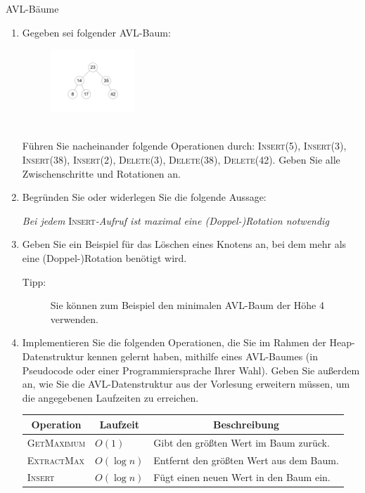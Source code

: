 \documentclass[11pt,a4paper]{article}
\begin{document}
\begin{aufgabe}{3}{AVL-Bäume}
    \begin{enumerate}
        \item Gegeben sei folgender AVL-Baum:
        \begin{figure}[h!]
            \centering
            \includegraphics[width=0.3\textwidth]{img/3a}
        \end{figure}
        \FloatBarrier
        \ \\
        Führen Sie nacheinander folgende Operationen durch: \textsc{Insert(5), Insert(3), Insert(38), Insert(2), Delete(3), Delete(38), Delete(42)}.
        Geben Sie alle Zwischenschritte und Rotationen an.
        \item Begründen Sie oder widerlegen Sie die folgende Aussage:
        \begin{center}
            \emph{Bei jedem }\textsc{Insert}\emph{-Aufruf ist maximal eine (Doppel-)Rotation notwendig}
        \end{center}
        \item Geben Sie ein Beispiel für das Löschen eines Knotens an, bei dem mehr als eine (Doppel-)Rotation benötigt wird.
        \begin{description}
            \item[Tipp:] Sie können zum Beispiel den minimalen AVL-Baum der Höhe 4 verwenden.
        \end{description}
        \item \hard Implementieren Sie die folgenden Operationen, die Sie im Rahmen der Heap-Datenstruktur kennen gelernt haben, mithilfe eines AVL-Baumes (in Pseudocode oder einer Programmiersprache Ihrer Wahl).
        Geben Sie außerdem an, wie Sie die AVL-Datenstruktur aus der Vorlesung erweitern müssen, um die angegebenen Laufzeiten zu erreichen.
        \begin{table}[h!]
            \centering
            \begin{tabular}{|l|l|l|}
            \hline
            \multicolumn{1}{|c|}{\textbf{Operation}}  & \multicolumn{1}{c|}{\textbf{Laufzeit}} & \multicolumn{1}{c|}{\textbf{Beschreibung}}\\ \hline
            \textsc{GetMaximum} & $O(1)$      & Gibt den größten Wert im Baum zurück.\\ \hline
            \textsc{ExtractMax} & $O(\log n)$ & Entfernt den größten Wert aus dem Baum. \\ \hline
            \textsc{Insert}     & $O(\log n)$ & Fügt einen neuen Wert in den Baum ein. \\ \hline
            \end{tabular}
        \end{table}
    \end{enumerate}
\end{aufgabe}
\end{document}
